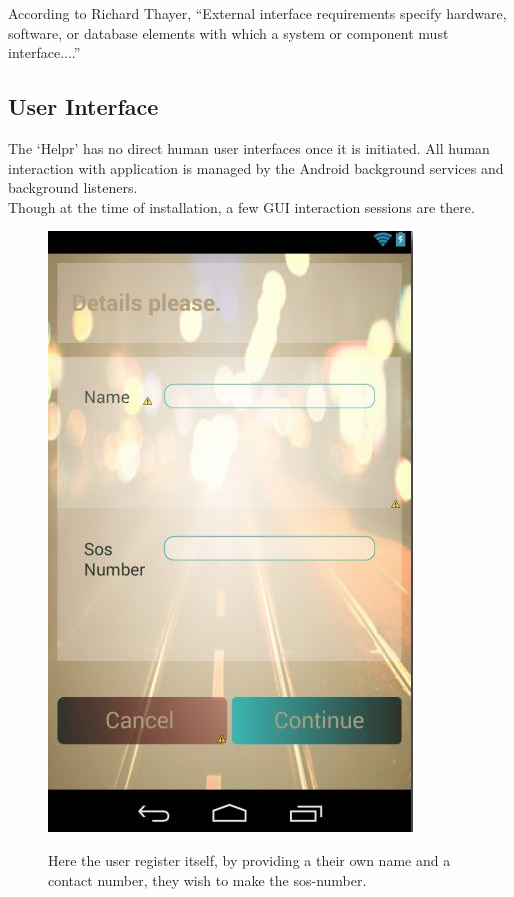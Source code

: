 According to Richard Thayer, ``External interface requirements specify hardware, software, or database elements with which a system or component must interface....''

\subsection{User Interface}
\label{subsec:subsec01}

The `Helpr' has no direct human user interfaces once it is initiated. All human interaction with application is managed by the Android background services and background listeners. \\

Though at the time of installation, a few GUI interaction sessions are there. 

\begin{figure}[h]
	\centering
	\includegraphics[height=0.35\textheight]{fig01/s_register}
	\label{fig:RHP01}

Here the user register itself, by providing a their own name and a contact number, they wish to make the sos-number.
\end{figure}

